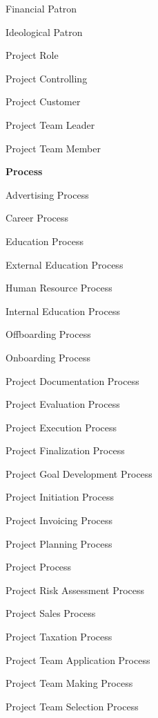 \documentclass[a4paper, DIV=13, BCOR=0cm]{scrbook}
\begin{document}
\begin{multicols}{2}
\begin{compactitem}
\begin{compactitem}
\begin{compactitem}
\begin{compactitem}
					\item Financial Patron
					\item Ideological Patron
				\end{compactitem}
			\end{compactitem}
			\item Project Role
			\begin{compactitem}
				\item Project Controlling
				\item Project Customer
				\item Project Team Leader
				\item Project Team Member
			\end{compactitem}
		\end{compactitem}
		\item \textbf{Process}
		\begin{compactitem}
			\item Advertising Process
			\item Career Process
			\item Education Process
			\item External Education Process
			\item Human Resource Process
			\item Internal Education Process
			\item Offboarding Process
			\item Onboarding Process
			\item Project Documentation Process
			\item Project Evaluation Process
			\item Project Execution Process
			\item Project Finalization Process
			\item Project Goal Development Process
			\item Project Initiation Process
			\item Project Invoicing Process
			\item Project Planning Process
			\item Project Process
			\item Project Risk Assessment Process
			\item Project Sales Process
			\item Project Taxation Process
			\item Project Team Application Process
			\item Project Team Making Process
			\item Project Team Selection Process

\end{compactitem}
\end{compactitem}
\end{multicols}
\end{document}
